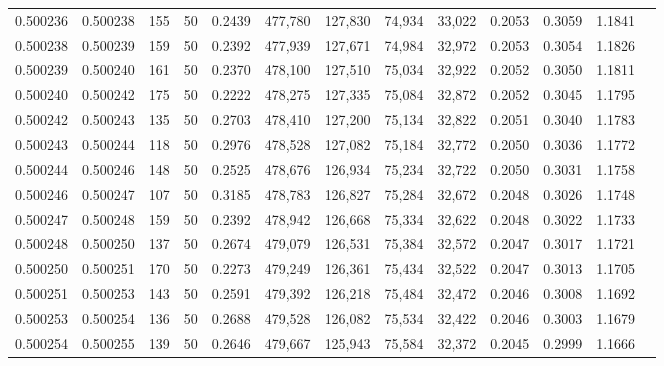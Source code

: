\begin{tabular}{rrrrrrrrrrrrr}
0.500236 & 0.500238 & 155 &  50 &                                     0.2439 & 477,780 & 127,830 &  74,934 &  33,022 & 0.2053 & 0.3059 & 1.1841 \\
0.500238 & 0.500239 & 159 &  50 &                                     0.2392 & 477,939 & 127,671 &  74,984 &  32,972 & 0.2053 & 0.3054 & 1.1826 \\
0.500239 & 0.500240 & 161 &  50 &                                     0.2370 & 478,100 & 127,510 &  75,034 &  32,922 & 0.2052 & 0.3050 & 1.1811 \\
0.500240 & 0.500242 & 175 &  50 &                                     0.2222 & 478,275 & 127,335 &  75,084 &  32,872 & 0.2052 & 0.3045 & 1.1795 \\
0.500242 & 0.500243 & 135 &  50 &                                     0.2703 & 478,410 & 127,200 &  75,134 &  32,822 & 0.2051 & 0.3040 & 1.1783 \\
0.500243 & 0.500244 & 118 &  50 &                                     0.2976 & 478,528 & 127,082 &  75,184 &  32,772 & 0.2050 & 0.3036 & 1.1772 \\
0.500244 & 0.500246 & 148 &  50 &                                     0.2525 & 478,676 & 126,934 &  75,234 &  32,722 & 0.2050 & 0.3031 & 1.1758 \\
0.500246 & 0.500247 & 107 &  50 &                                     0.3185 & 478,783 & 126,827 &  75,284 &  32,672 & 0.2048 & 0.3026 & 1.1748 \\
0.500247 & 0.500248 & 159 &  50 &                                     0.2392 & 478,942 & 126,668 &  75,334 &  32,622 & 0.2048 & 0.3022 & 1.1733 \\
0.500248 & 0.500250 & 137 &  50 &                                     0.2674 & 479,079 & 126,531 &  75,384 &  32,572 & 0.2047 & 0.3017 & 1.1721 \\
0.500250 & 0.500251 & 170 &  50 &                                     0.2273 & 479,249 & 126,361 &  75,434 &  32,522 & 0.2047 & 0.3013 & 1.1705 \\
0.500251 & 0.500253 & 143 &  50 &                                     0.2591 & 479,392 & 126,218 &  75,484 &  32,472 & 0.2046 & 0.3008 & 1.1692 \\
0.500253 & 0.500254 & 136 &  50 &                                     0.2688 & 479,528 & 126,082 &  75,534 &  32,422 & 0.2046 & 0.3003 & 1.1679 \\
0.500254 & 0.500255 & 139 &  50 &                                     0.2646 & 479,667 & 125,943 &  75,584 &  32,372 & 0.2045 & 0.2999 & 1.1666 \\

\end{tabular}

